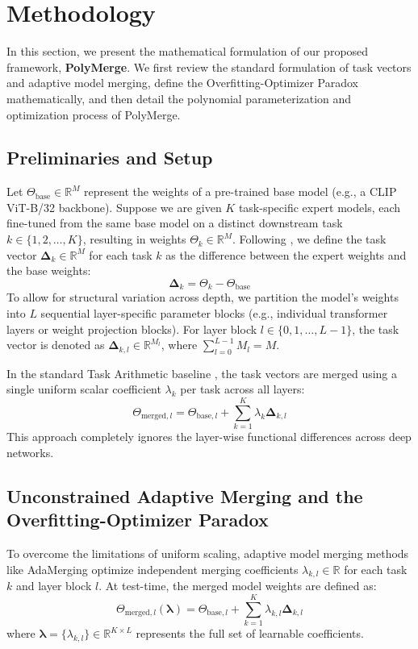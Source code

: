 \section{Methodology}
\label{sec:methodology}

In this section, we present the mathematical formulation of our proposed framework, \textbf{PolyMerge}. We first review the standard formulation of task vectors and adaptive model merging, define the Overfitting-Optimizer Paradox mathematically, and then detail the polynomial parameterization and optimization process of PolyMerge.

\subsection{Preliminaries and Setup}
Let $\Theta_{\text{base}} \in \mathbb{R}^M$ represent the weights of a pre-trained base model (e.g., a CLIP ViT-B/32 backbone). Suppose we are given $K$ task-specific expert models, each fine-tuned from the same base model on a distinct downstream task $k \in \{1, 2, \dots, K\}$, resulting in weights $\Theta_k \in \mathbb{R}^M$. Following \cite{ilharco2022editing}, we define the task vector $\mathbf{\Delta}_k \in \mathbb{R}^M$ for each task $k$ as the difference between the expert weights and the base weights:
\begin{equation}
\mathbf{\Delta}_k = \Theta_k - \Theta_{\text{base}}
\end{equation}
To allow for structural variation across depth, we partition the model's weights into $L$ sequential layer-specific parameter blocks (e.g., individual transformer layers or weight projection blocks). For layer block $l \in \{0, 1, \dots, L-1\}$, the task vector is denoted as $\mathbf{\Delta}_{k, l} \in \mathbb{R}^{M_l}$, where $\sum_{l=0}^{L-1} M_l = M$.

In the standard Task Arithmetic baseline \cite{ilharco2022editing}, the task vectors are merged using a single uniform scalar coefficient $\lambda_k$ per task across all layers:
\begin{equation}
\Theta_{\text{merged}, l} = \Theta_{\text{base}, l} + \sum_{k=1}^K \lambda_k \mathbf{\Delta}_{k, l}
\end{equation}
This approach completely ignores the layer-wise functional differences across deep networks.

\subsection{Unconstrained Adaptive Merging and the Overfitting-Optimizer Paradox}
To overcome the limitations of uniform scaling, adaptive model merging methods like AdaMerging \cite{yang2024adamerging} optimize independent merging coefficients $\lambda_{k, l} \in \mathbb{R}$ for each task $k$ and layer block $l$. At test-time, the merged model weights are defined as:
\begin{equation}
\Theta_{\text{merged}, l}(\boldsymbol{\lambda}) = \Theta_{\text{base}, l} + \sum_{k=1}^K \lambda_{k, l} \mathbf{\Delta}_{k, l}
\end{equation}
where $\boldsymbol{\lambda} = \{ \lambda_{k, l} \} \in \mathbb{R}^{K \times L}$ represents the full set of learnable coefficients.


